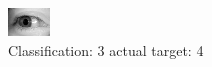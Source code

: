 \begin{figure}[h!]
\begin{center}
\includegraphics[width=0.60\columnwidth]{figures/ID3154_class_3_target_4.png}
\end{center}
\caption{ Classification: 3 actual target: 4}
\label{fig:ID3154_class_3_target_4}
\end{figure}
